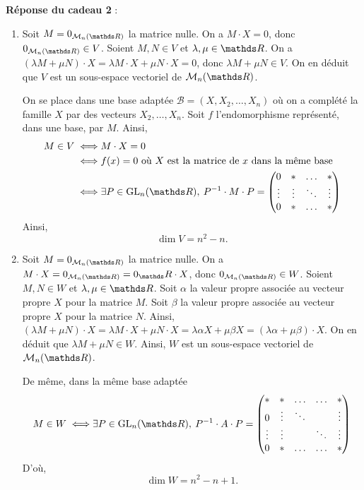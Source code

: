 \documentclass[a4paper]{article}
\begin{document}
	\bigskip
	\bigskip
	\textbf{Réponse du cadeau 2} :\\
	\begin{enumerate}[label=(\alph*)]
		\item Soit $M = 0_{\mathcal{M}_n(\R)}$\/ la matrice nulle. On a $M \cdot X = 0$, donc $0_{\mathcal{M}_n(\R)} \in V$.
			Soient $M,N \in V$\/ et $\lambda, \mu \in \R$. On a $(\lambda M + \mu N)\cdot X = \lambda M \cdot X + \mu N \cdot X = 0$, donc $\lambda M + \mu N \in V$.
			On en déduit que $V$\/ est un sous-espace vectoriel de $\mathcal{M}_n(\R)$.

			On se place dans une base adaptée $\mathcal{B} = (X, X_2, \ldots, X_n)$\/  où on a complété la famille $X$\/ par des vecteurs $X_2,\ldots,X_n$.
			Soit $f$\/ l'endomorphisme représenté, dans une base, par $M$.
			Ainsi,
			\begin{align*}
				M \in V \iff& M \cdot X = 0 \\
				\iff&  f(x) = 0 \text{ où $X$ est la matrice de $x$ dans la même base} \\
				\iff& \exists P \in \mathrm{GL}_n(\R),\: P^{-1}\cdot M\cdot P = \begin{pmatrix}
					0 & * & \ldots & *\\
					\vdots & \vdots & \ddots & \vdots\\
					0 & * & \ldots & *
				\end{pmatrix} \\
			\end{align*}
			Ainsi, \[
				\boxed{\dim V = n^2 - n.}
			\]
		\item Soit $M = 0_{\mathcal{M}_n(\R)}$\/ la matrice nulle. On a $M \cdot X = 0_{\mathcal{M}_n(\R)} = 0_\R \cdot X$, donc $0_{\mathcal{M}_n(\R)} \in W$.
			Soient $M,N \in W$\/ et $\lambda, \mu \in \R$.
			Soit $\alpha$\/ la valeur propre associée au vecteur propre $X$\/ pour la matrice $M$.
			Soit $\beta$\/ la valeur propre associée au vecteur propre $X$\/ pour la matrice $N$.
			Ainsi, $(\lambda M + \mu N)\cdot X = \lambda M\cdot X + \mu N \cdot X = \lambda \alpha X + \mu \beta X = (\lambda \alpha + \mu \beta) \cdot X$. On en déduit que $\lambda M + \mu N \in W$.
			Ainsi, $W$\/ est un sous-espace vectoriel de $\mathcal{M}_n(\R)$.

			De même, dans la même base adaptée
			\begin{align*}
				M \in W \iff& \exists P \in \mathrm{GL}_n(\R),\: P^{-1}\cdot A\cdot P = \begin{pmatrix}
					* & * & \ldots & \ldots & *\\
					0 & \vdots & \ddots & & \vdots\\
					\vdots & \vdots & & \ddots & \vdots\\
					0 & * & \ldots & \ldots & *
				\end{pmatrix} \\
			\end{align*}
			D'où, \[
				\boxed{\dim W = n^2 - n + 1.}
			\]
	\end{enumerate}
\end{document}
